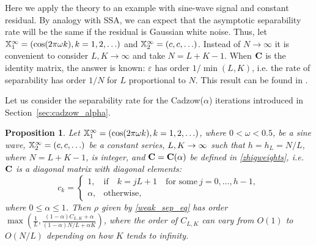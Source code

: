 \documentclass[sii]{ipart}
\newtheorem{proposition}{Proposition}
\begin{document}
Here we apply the theory to an example with sine-wave signal and constant residual. By analogy with SSA, we can expect that the asymptotic separability rate will be the same if the residual is Gaussian white noise.
Thus, let
$\mathbb{X}_1^\infty = (\cos(2 \pi \omega k), k = 1, 2, \ldots)$ and  $\mathbb{X}_2^\infty = (c, c, \ldots)$. Instead of $N \to \infty$ it is convenient to consider $L,K \to \infty$ and take $N = L + K - 1$. When $\mathbf{C}$ is the identity matrix, the answer is known: $\varepsilon$ has order $1/\min(L,K)$, i.e. the rate of separability has order $1/N$ for $L$ proportional to $N$.
This result can be found in \cite[Chapter 6.1]{Golyandina.etal2001}.

\smallskip
Let us consider the separability rate for the Cadzow($\alpha$) iterations introduced in Section~\ref{sec:cadzow_alpha}.

\begin{proposition}
	\label{prop:separ1}
	Let $\mathbb{X}_1^\infty = (\cos(2 \pi \omega k), k = 1, 2, \ldots)$, where $0<\omega <0.5$, be a sine wave, $\mathbb{X}_2^\infty = (c, c, \ldots)$ be a constant series,  $L,K\rightarrow \infty$ such that $h = h_L = N/L$, where $N=L+K-1$, is integer, and $\mathbf{C}=\mathbf{C}(\alpha)$ be defined in \eqref{zhigweights}, i.e.  $\mathbf{C}$ is a diagonal matrix with diagonal elements:
	\begin{equation*}
	c_k = \begin{cases}
	1, & \text{if} \quad k = jL+1 \quad \text{for some} \ j = 0, \ldots, h-1,\\
	\alpha, & \text{otherwise},
	\end{cases}
	\end{equation*}
	where $0 \le \alpha \le 1$. Then $\rho$ given by \eqref{weak_sep_eq} has order $\max\left(\frac{1}{L}, \frac{(1-\alpha)C_{L,K}+\alpha}{(1-\alpha)N/L+\alpha K}\right)$, where the order of $C_{L,K}$
	can vary from $O(1)$ to $O(N/L)$ depending on how $K$ tends to infinity.
\end{proposition}
\end{document}
